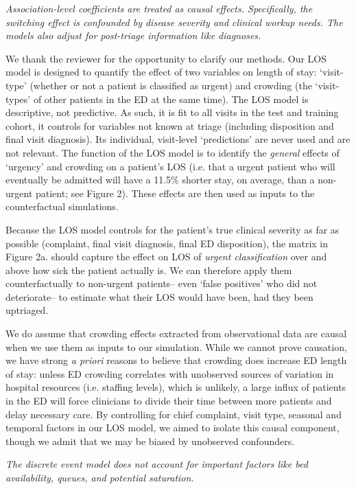      \textit{Association-level coefficients are treated as causal effects. Specifically, the switching effect is confounded by disease severity and clinical workup needs. The models also adjust for post-triage information like diagnoses.}


We thank the reviewer for the opportunity to clarify our methods. Our LOS model is designed to quantify the effect of two variables on length of stay: `visit-type' (whether or not a patient is classified as urgent) and crowding (the `visit-types' of other patients in the ED at the same time). The LOS model is descriptive, not predictive. As such, it is fit to all visits in the test and training cohort, it controls for variables not known at triage (including disposition and final visit diagnosis). Its individual, visit-level `predictions' are never used and are not relevant. The function of the LOS model is to identify the \textit{general} effects of `urgency' and crowding on a patient's LOS (i.e. that a urgent patient who will eventually be admitted will have a 11.5\% shorter stay, on average, than a non-urgent patient; see Figure 2). These effects are then used as inputs to the counterfactual simulations.

Because the LOS model controls for the patient's true clinical severity as far as possible (complaint, final visit diagnosis, final ED disposition), the matrix in Figure 2a. should capture the effect on LOS of\textit{ urgent classification} over and above how sick the patient actually is. We can therefore apply them counterfactually to non-urgent patients-- even `false positives' who did not deteriorate-- to estimate what their LOS would have been, had they been uptriaged. 

We do assume that crowding effects extracted from observational data are causal when we use them as inputs to our simulation. While we cannot prove causation, we have strong \textit{a priori} reasons to believe that crowding does increase ED length of stay: unless ED crowding correlates with unobserved sources of variation in hospital resources (i.e. staffing levels), which is unlikely, a large influx of patients in the ED will force clinicians to divide their time between more patients and delay necessary care. By controlling for chief complaint, visit type, seasonal and temporal factors in our LOS model, we aimed to isolate this causal component, though we admit that we may be biased by unobserved confounders.


\textit{     The discrete event model does not account for important factors like bed availability, queues, and potential saturation.}

